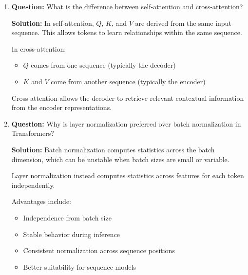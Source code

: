 \documentclass[11pt]{article}
\begin{document}
\begin{enumerate}
\textbf{Solution:}
If the components of $Q$ and $K$ have variance near 1, the variance of their dot product grows proportionally to $d_k$.

Large dot products push the softmax into regions with very small gradients, which harms learning.

Dividing by $\sqrt{d_k}$ normalizes the magnitude of the dot products:

\[
\text{Attention}(Q,K,V)
=
\text{softmax}
\left(
\frac{QK^\top}{\sqrt{d_k}}
\right)V
\]

This keeps gradients well-scaled and improves training stability.

\item \textbf{Question:} What is the difference between self-attention and cross-attention?

\textbf{Solution:}
In self-attention, $Q$, $K$, and $V$ are derived from the same input sequence. This allows tokens to learn relationships within the same sequence.

In cross-attention:

\begin{itemize}[nosep]

\item $Q$ comes from one sequence (typically the decoder)
\item $K$ and $V$ come from another sequence (typically the encoder)

\end{itemize}

Cross-attention allows the decoder to retrieve relevant contextual information from the encoder representations.

\item \textbf{Question:} Why is layer normalization preferred over batch normalization in Transformers?

\textbf{Solution:}
Batch normalization computes statistics across the batch dimension, which can be unstable when batch sizes are small or variable.

Layer normalization instead computes statistics across features for each token independently.

Advantages include:

\begin{itemize}[nosep]

\item Independence from batch size
\item Stable behavior during inference
\item Consistent normalization across sequence positions
\item Better suitability for sequence models


\end{itemize}
\end{enumerate}
\end{document}
